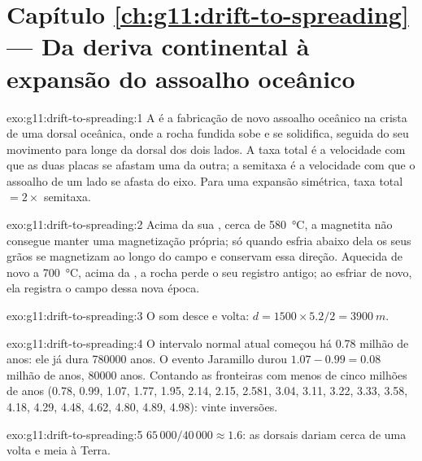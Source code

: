 \section*{Capítulo \ref{ch:g11:drift-to-spreading} --- Da deriva continental à expansão do assoalho oceânico}

\begin{solution}{exo:g11:drift-to-spreading:1}
A  é a fabricação de novo assoalho oceânico na
crista de uma dorsal oceânica, onde a rocha fundida sobe e se solidifica,
seguida do seu movimento para longe da dorsal dos dois lados. A taxa total é
a velocidade com que as duas placas se afastam uma da outra; a semitaxa é a
velocidade com que o assoalho de um lado se afasta do eixo. Para uma
expansão simétrica, taxa total $= 2
\times$ semitaxa.
\end{solution}

\begin{solution}{exo:g11:drift-to-spreading:2}
Acima da sua , cerca de \qty{580}{\celsius}, a magnetita
não consegue manter uma magnetização própria; só quando esfria abaixo dela os
seus grãos se magnetizam ao longo do campo e conservam essa direção.
Aquecida de novo a \qty{700}{\celsius}, acima da , a
rocha perde o seu registro antigo; ao esfriar de novo, ela registra o campo
dessa nova época.
\end{solution}

\begin{solution}{exo:g11:drift-to-spreading:3}
O som desce e volta: $d = 1500 \times 5.2/2 = \qty{3900}{m}$.
\end{solution}

\begin{solution}{exo:g11:drift-to-spreading:4}
O intervalo normal atual começou há \num{0.78} milhão de anos: ele já dura
\num{780000} anos. O evento Jaramillo durou $1.07 - 0.99 = \num{0.08}$
milhão de anos, \num{80000} anos. Contando as fronteiras com menos de cinco
milhões de anos (0.78, 0.99, 1.07, 1.77, 1.95, 2.14, 2.15, 2.581, 3.04, 3.11,
3.22, 3.33, 3.58, 4.18, 4.29, 4.48, 4.62, 4.80, 4.89, 4.98): vinte inversões.
\end{solution}

\begin{solution}{exo:g11:drift-to-spreading:5}
$65\,000/40\,000 \approx 1.6$: as dorsais dariam cerca de uma volta e meia
à Terra.
\end{solution}

